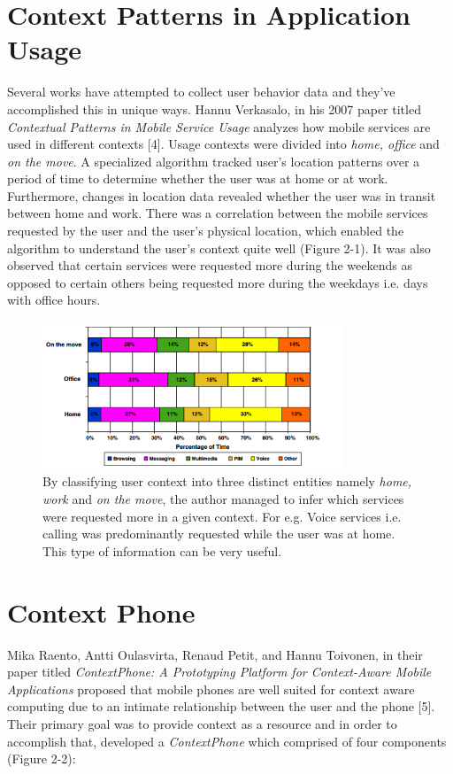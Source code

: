 \documentclass[12pt]{uthesis-v12}  %
\begin{document}
	\section{Context Patterns in Application Usage}
		Several works have attempted to collect user behavior data and they've accomplished this in unique ways. Hannu Verkasalo, in his 2007 paper titled {\em Contextual Patterns in Mobile Service Usage} analyzes how mobile services are used in different contexts [4]. Usage contexts were divided into {\em home, office} and {\em on the move}. A specialized algorithm tracked user's location patterns over a period of time to determine whether the user was at home or at work. Furthermore, changes in location data revealed whether the user was in transit between home and work. There was a correlation between the mobile services requested by the user and the user's physical location, which enabled the algorithm to understand the user's context quite well (Figure 2-1). It was also observed that certain services were requested more during the weekends as opposed to certain others being requested more during the weekdays i.e. days with office hours.  
		
		\begin{figure}[!ht]
			\centering
			\includegraphics[width = 90mm]{images/appsByTime.png}
			\caption[Mobile Services Requested at Various Times of the Day]
			{By classifying user context into three distinct entities namely {\em home, work} and {\em on the move}, the author managed to infer which services were requested more in a given context. For e.g. Voice services i.e. calling was predominantly requested while the user was at home. This type of information can be very useful.}
		\end{figure}
	
	\section{Context Phone}
		Mika Raento, Antti Oulasvirta, Renaud Petit, and Hannu Toivonen, in their paper titled {\em ContextPhone: A Prototyping Platform for Context-Aware Mobile Applications} proposed that mobile phones are well suited for context aware computing due to an intimate relationship between the user and the phone [5]. Their primary goal was to provide context as a resource and in order to accomplish that, developed a {\em ContextPhone} which comprised of four components (Figure 2-2):
		
\end{document}
